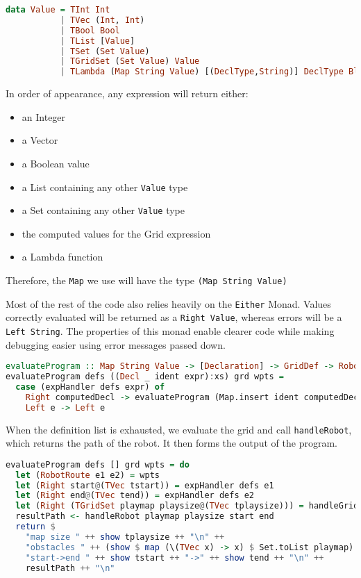 \begin{lstlisting}[caption={},language=haskell]
data Value = TInt Int
           | TVec (Int, Int)
           | TBool Bool
           | TList [Value]
           | TSet (Set Value)
           | TGridSet (Set Value) Value
           | TLambda (Map String Value) [(DeclType,String)] DeclType Block
\end{lstlisting}

In order of appearance, any expression will return either:
\begin{itemize}
    \item an Integer
    \item a Vector
    \item a Boolean value
    \item a List containing any other \lstinline{Value} type
    \item a Set containing any other \lstinline{Value} type
    \item the computed values for the Grid expression
    \item a Lambda function
\end{itemize}

Therefore, the \lstinline{Map} we use will have the type \lstinline{(Map String Value)}

Most of the rest of the code also relies heavily on the \lstinline{Either} Monad. Values correctly evaluated will be returned as a \lstinline{Right Value}, whereas errors will be a \lstinline{Left String}. The properties of this monad enable clearer code while making debugging easier using error messages passed down.

\begin{lstlisting}[caption={The part of evaluateProgram that handles definitions},language=haskell]
evaluateProgram :: Map String Value -> [Declaration] -> GridDef -> RobotRoute -> Either String String
evaluateProgram defs ((Decl _ ident expr):xs) grd wpts =
  case (expHandler defs expr) of
    Right computedDecl -> evaluateProgram (Map.insert ident computedDecl defs) xs grd wpts
    Left e -> Left e
\end{lstlisting}

When the definition list is exhausted, we evaluate the grid and call \lstinline{handleRobot}, which returns the path of the robot. It then forms the output of the program.

\begin{lstlisting}[caption={The part of evaluateProgram that handles the grid and the robot path},language=haskell, label={evaluator:evaluateprogram2}]
evaluateProgram defs [] grd wpts = do
  let (RobotRoute e1 e2) = wpts
  let (Right start@(TVec tstart)) = expHandler defs e1
  let (Right end@(TVec tend)) = expHandler defs e2
  let (Right (TGridSet playmap playsize@(TVec tplaysize))) = handleGrid grd defs
  resultPath <- handleRobot playmap playsize start end
  return $
    "map size " ++ show tplaysize ++ "\n" ++
    "obstacles " ++ (show $ map (\(TVec x) -> x) $ Set.toList playmap) ++ "\n" ++
    "start->end " ++ show tstart ++ "->" ++ show tend ++ "\n" ++
    resultPath ++ "\n"
\end{lstlisting}


